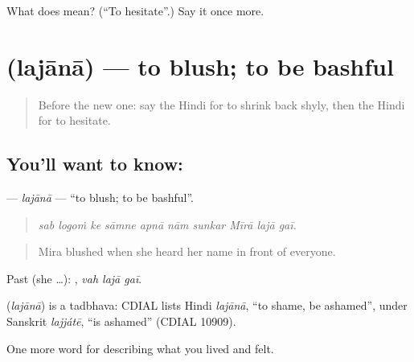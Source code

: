\begin{tcolorbox}[breakable,colback=teal!4,colframe=teal!35!black,title={Before you move on}]
What does  mean? (\textquotedblleft{}To hesitate\textquotedblright{}.) Say it once more.
\end{tcolorbox}
\section[\texorpdfstring{\hi{लजाना} (lajānā)}{लजाना (lajānā)}]{ (lajānā) — to blush; to be bashful}

\label{lesson:HI-C461-lajana}



\begin{quote}
Before the new one: say the Hindi for to shrink back shyly, then the Hindi for to hesitate.
\end{quote}

\subsection*{You'll want to know: }
\textbf{} — \emph{lajānā} — \textquotedblleft{}to blush; to be bashful\textquotedblright{}.

\begin{quote}
         
\end{quote}

\begin{quote}
\emph{sab logoṁ ke sāmne apnā nām sunkar Mīrā lajā gaī.}
\end{quote}

\begin{quote}
Mira blushed when she heard her name in front of everyone.
\end{quote}

Past (she …):   , \emph{vah lajā gaī}.

\begin{cousinweb}
\textbf{} (\emph{lajānā}) is a tadbhava: CDIAL lists Hindi \emph{lajānā}, \textquotedblleft{}to shame, be ashamed\textquotedblright{}, under Sanskrit \emph{lajjátē}, \textquotedblleft{}is ashamed\textquotedblright{} (CDIAL 10909).
\end{cousinweb}

\begin{grammarlens}[title={What you've built}]
One more word for describing what you lived and felt.
\end{grammarlens}


